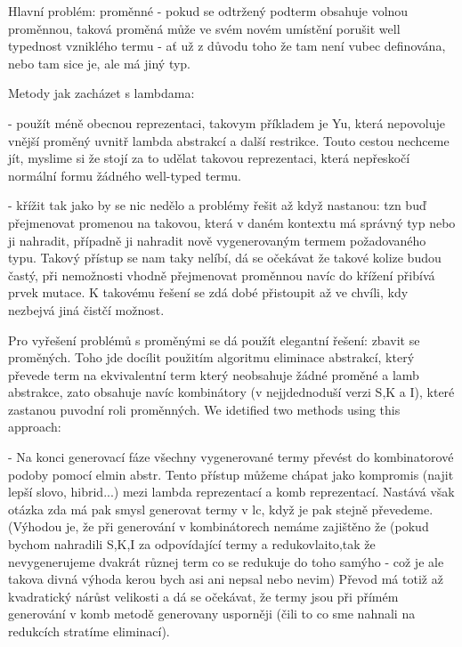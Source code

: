 \documentclass{sig-alternate}
\newcommand{\red}[1]{{\color{red} #1}}
\begin{document}
\red{Hlavní problém: proměnné - pokud se odtržený podterm obsahuje volnou proměnnou, taková proměná může ve svém novém umístění porušit well typednost vzniklého termu - ať už z důvodu toho že tam není vubec definována, nebo tam sice je, ale má jiný typ.  

Metody jak zacházet s lambdama:

- použít méně obecnou reprezentaci, takovym
  příkladem je Yu, která nepovoluje vnější proměný uvnitř
  lambda abstrakcí a další restrikce. Touto cestou nechceme jít,
  myslime si že stojí za to udělat takovou reprezentaci, která nepřeskočí
  normální formu žádného well-typed termu.

- křížit tak jako by se nic nedělo a problémy řešit až když nastanou:
  tzn buď přejmenovat promenou na takovou, která v daném kontextu má správný typ nebo ji nahradit, případně ji nahradit nově vygenerovaným termem požadovaného typu. 
  Takový přístup se nam taky nelíbí, dá se očekávat že takové kolize budou častý, při nemožnosti vhodně přejmenovat proměnnou navíc do křížení přibívá
  prvek mutace. K takovému řešení se zdá dobé přistoupit až ve chvíli, kdy nezbejvá jiná čistčí možnost.

Pro vyřešení problémů s proměnými se dá použít elegantní řešení: zbavit se proměných. Toho jde docílit použitím algoritmu eliminace abstrakcí, který převede term na ekvivalentní term který neobsahuje žádné proměné a lamb abstrakce, zato obsahuje navíc kombinátory (v nejjdednoduší verzi S,K a I), které zastanou puvodní roli proměnných. We idetified two methods using this approach:

- Na konci generovací fáze všechny vygenerované termy převést do kombinatorové
  podoby pomocí elmin abstr. Tento přístup můžeme chápat jako kompromis (najit lepší slovo, hibrid...) mezi lambda reprezentací a komb reprezentací. Nastává však otázka zda má pak smysl generovat termy v lc, když je pak stejně převedeme. (Výhodou je, že
při generování v kombinátorech nemáme zajištěno že (pokud bychom nahradili S,K,I 
za odpovídající termy a redukovlaito,tak že nevygenerujeme dvakrát různej term co se redukuje do toho samýho - což je ale takova divná výhoda kerou bych asi ani nepsal nebo nevim) Převod má totiž až kvadratický nárůst velikosti a dá se očekávat, že termy jsou při přímém generování v komb metodě generovany usporněji (čili to co sme nahnali na redukcích stratíme eliminací).

}
\end{document}
